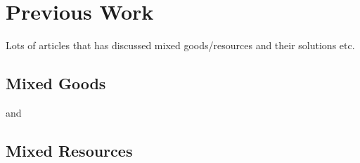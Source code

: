 \section{Previous Work}\label{sec:previous-work}


Lots of articles that has discussed mixed goods/resources and their solutions etc.

\subsection{Mixed Goods}\label{subsec:mixed-goods}

\cite{maximin} and \cite{mixed-goods} \cite{mixed-manna}


\subsection{Mixed Resources}\label{subsec:mixed-resources}

\cite{mixed-resources}